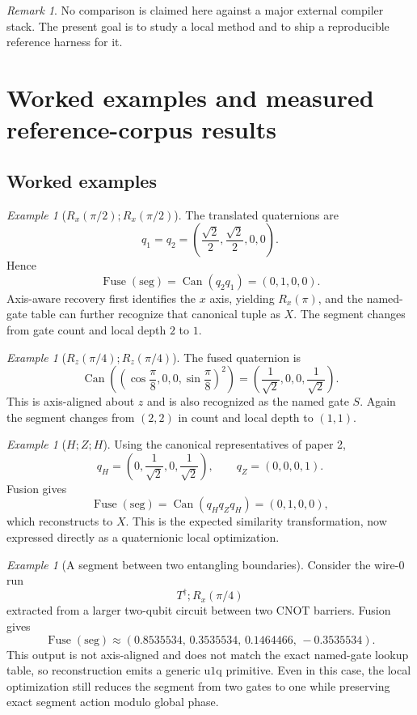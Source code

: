 \documentclass[11pt]{article}
\theoremstyle{remark}
\newtheorem{remark}[definition]{Remark}
\newtheorem{example}[definition]{Example}
\newcommand{\uoneq}{\mathrm{u1q}}
\newcommand{\canon}{\operatorname{Can}}
\newcommand{\Fuse}{\operatorname{Fuse}}
\begin{document}
\begin{remark}
No comparison is claimed here against a major external compiler stack. The
present goal is to study a local method and to ship a reproducible reference
harness for it.
\end{remark}

\section{Worked examples and measured reference-corpus results}

\subsection{Worked examples}

\begin{example}[$R_x(\pi/2);R_x(\pi/2)$]
The translated quaternions are
\[
q_1=q_2=\left(\frac{\sqrt2}{2},\frac{\sqrt2}{2},0,0\right).
\]
Hence
\[
\Fuse(\mathrm{seg})=\canon(q_2 q_1)=(0,1,0,0).
\]
Axis-aware recovery first identifies the $x$ axis, yielding $R_x(\pi)$, and the
named-gate table can further recognize that canonical tuple as $X$. The segment
changes from gate count and local depth $2$ to $1$.
\end{example}

\begin{example}[$R_z(\pi/4);R_z(\pi/4)$]
The fused quaternion is
\[
\canon\!\left(
\left(\cos\frac{\pi}{8},0,0,\sin\frac{\pi}{8}\right)^2
\right)
=
\left(\frac{1}{\sqrt2},0,0,\frac{1}{\sqrt2}\right).
\]
This is axis-aligned about $z$ and is also recognized as the named gate $S$.
Again the segment changes from $(2,2)$ in count and local depth to $(1,1)$.
\end{example}

\begin{example}[$H;Z;H$]
Using the canonical representatives of paper 2,
\[
q_H=\left(0,\frac{1}{\sqrt2},0,\frac{1}{\sqrt2}\right),
\qquad
q_Z=(0,0,0,1).
\]
Fusion gives
\[
\Fuse(\mathrm{seg})=\canon(q_H q_Z q_H)=(0,1,0,0),
\]
which reconstructs to $X$. This is the expected similarity transformation, now
expressed directly as a quaternionic local optimization.
\end{example}

\begin{example}[A segment between two entangling boundaries]
Consider the wire-0 run
\[
T^\dagger;R_x(\pi/4)
\]
extracted from a larger two-qubit circuit between two CNOT barriers. Fusion
gives
\[
\Fuse(\mathrm{seg})\approx
(0.8535534,\,0.3535534,\,0.1464466,\,-0.3535534).
\]
This output is not axis-aligned and does not match the exact named-gate lookup
table, so reconstruction emits a generic $\uoneq$ primitive. Even in this case,
the local optimization still reduces the segment from two gates to one while
preserving exact segment action modulo global phase.
\end{example}
\end{document}

